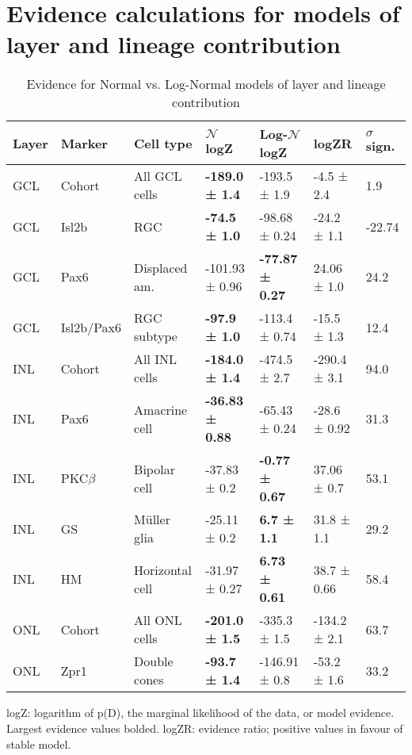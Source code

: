\section{Evidence calculations for models of layer and lineage contribution}
\FloatBarrier

\begin{table}[!ht]
    \caption{Evidence for Normal vs. Log-Normal models of layer and lineage contribution}
    \begin{tabular}{|l|l|l|l|l|l|l|} 
        \hline
        {\bf Layer} & {\bf Marker} & {\bf Cell type} & {\bf $\mathcal{N}$ logZ} & {\bf Log-$\mathcal{N}$ logZ} & {\bf logZR} & {\bf $\sigma$ sign.}\\ \hline \hline
        GCL & Cohort & All GCL cells & {\bf -189.0 ± 1.4} & -193.5 ± 1.9 & -4.5 ± 2.4 & 1.9\\ \hline \hline
        GCL & Isl2b & RGC & {\bf -74.5 ± 1.0} & -98.68 ± 0.24 & -24.2 ± 1.1 & -22.74\\ \hline
        GCL & Pax6 & Displaced am. & -101.93 ± 0.96 & {\bf -77.87 ± 0.27} & 24.06 ± 1.0 & 24.2\\ \hline
        GCL & Isl2b/Pax6 & RGC subtype & {\bf -97.9 ± 1.0} & -113.4 ± 0.74 & -15.5 ± 1.3 & 12.4\\ \hline \hline
        INL & Cohort & All INL cells & {\bf -184.0 ± 1.4} & -474.5 ± 2.7 & -290.4 ± 3.1 & 94.0\\ \hline \hline
        INL & Pax6 & Amacrine cell & {\bf -36.83 ± 0.88} & -65.43 ± 0.24 & -28.6 ± 0.92 & 31.3\\ \hline
        INL & PKC$\beta$ & Bipolar cell & -37.83 ± 0.2 & {\bf -0.77 ± 0.67} & 37.06 ± 0.7 & 53.1\\ \hline
        INL & GS & M\"{u}ller glia & -25.11 ± 0.2 & {\bf 6.7 ± 1.1} & 31.8 ± 1.1 & 29.2\\ \hline
        INL & HM & Horizontal cell & -31.97 ± 0.27 & {\bf 6.73 ± 0.61} & 38.7 ± 0.66 & 58.4\\ \hline \hline
        ONL & Cohort & All ONL cells & {\bf -201.0 ± 1.5} & -335.3 ± 1.5 & -134.2 ± 2.1 & 63.7\\ \hline \hline
        ONL & Zpr1 & Double cones & {\bf -93.7 ± 1.4} & -146.91 ± 0.8 & -53.2 ± 1.6 & 33.2\\ \hline
    \end{tabular}
   
    \begin{flushleft}logZ: logarithm of p(D), the marginal likelihood of the data, or model evidence.  Largest evidence values bolded. logZR: evidence ratio; positive values in favour of stable model.
    \end{flushleft}
    \label{lineage_nlnev}
\end{table}


